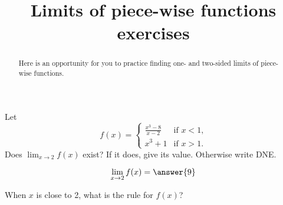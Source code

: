 \documentclass[handout]{ximera}
\title[Exercises:]{Limits of piece-wise functions exercises}
\begin{document}
\begin{abstract}
Here is an opportunity for you to practice finding one- and two-sided limits of piece-wise functions.
\end{abstract}
\maketitle

\begin{exercise}
Let
\[
f(x) = \begin{cases}
  \frac{x^3 - 8}{x-2}  &\text{if $x<1$,} \\
  x^3+1 &\text{if  $x>1$.}
\end{cases}
\]
Does $\displaystyle\lim_{x \to 2} f(x)$ exist?  If it does, give its value.
Otherwise write DNE.

\[
\lim_{x \to 2} f(x) = \answer{9}
\]

\begin{hint}
When $x$ is close to 2, what is the rule for $f(x)$?
\end{hint}

\end{exercise}
\end{document}
